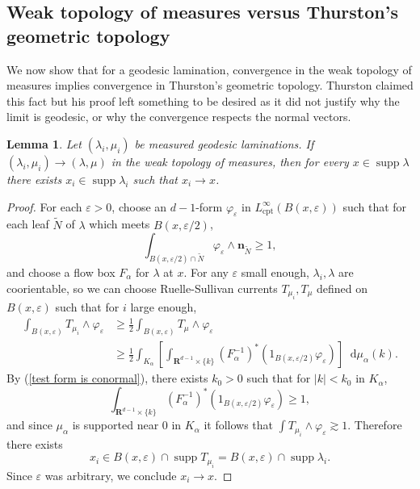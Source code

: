 \documentclass[reqno,11pt]{amsart}
\newcommand{\RR}{\mathbf{R}}
\newcommand*\dif{\mathop{}\!\mathrm{d}}
\DeclareMathOperator{\supp}{supp}
\newcommand{\normal}{\mathbf n}
\newcommand{\cpt}{\mathrm{cpt}}
\newtheorem{lemma}[theorem]{Lemma}
\theoremstyle{definition}
\numberwithin{equation}{section}
\begin{document}
\subsection{Weak topology of measures versus Thurston's geometric topology}
We now show that for a geodesic lamination, convergence in the weak topology of measures implies convergence in Thurston's geometric topology.
Thurston claimed this fact \cite[Proposition 8.10.3]{thurston1979geometry} but his proof left something to be desired as it did not justify why the limit is geodesic, or why the convergence respects the normal vectors.

\begin{lemma}
Let $(\lambda_i, \mu_i)$ be measured geodesic laminations.
If $(\lambda_i, \mu_i) \to (\lambda, \mu)$ in the weak topology of measures, then for every $x \in \supp \lambda$ there exists $x_i \in \supp \lambda_i$ such that $x_i \to x$.
\end{lemma}
\begin{proof}
For each $\varepsilon > 0$, choose an $d-1$-form $\varphi_\varepsilon$ in $L^\infty_\cpt(B(x, \varepsilon))$ such that for each leaf $\tilde N$ of $\lambda$ which meets $B(x, \varepsilon/2)$,
\begin{equation}\label{test form is conormal}
\int_{B(x, \varepsilon/2) \cap \tilde N} \varphi_\varepsilon \wedge \normal_{\tilde N} \geq 1,
\end{equation}
and choose a flow box $F_\alpha$ for $\lambda$ at $x$.
For any $\varepsilon$ small enough, $\lambda_i, \lambda$ are coorientable, so we can choose Ruelle-Sullivan currents $T_{\mu_i}, T_\mu$ defined on $B(x, \varepsilon)$ such that for $i$ large enough,
\begin{align*}
\int_{B(x, \varepsilon)} T_{\mu_i} \wedge \varphi_\varepsilon
&\geq \frac{1}{2} \int_{B(x, \varepsilon)} T_\mu \wedge \varphi_\varepsilon\\
&\geq \frac{1}{2} \int_{K_\alpha} \left[\int_{\RR^{d - 1} \times \{k\}} (F_\alpha^{-1})^* (1_{B(x, \varepsilon/2)} \varphi_\varepsilon)\right] \dif \mu_\alpha(k).
\end{align*}
By (\ref{test form is conormal}), there exists $k_0 > 0$ such that for $|k| < k_0$ in $K_\alpha$,
$$\int_{\RR^{d - 1} \times \{k\}} (F_\alpha^{-1})^* (1_{B(x, \varepsilon/2)} \varphi_\varepsilon) \geq 1,$$
and since $\mu_\alpha$ is supported near $0$ in $K_\alpha$ it follows that $\int T_{\mu_i} \wedge \varphi_\varepsilon \gtrsim 1$.
Therefore there exists
$$x_i \in B(x, \varepsilon) \cap \supp T_{\mu_i} = B(x, \varepsilon) \cap \supp \lambda_i.$$
Since $\varepsilon$ was arbitrary, we conclude $x_i \to x$.
\end{proof}
\end{document}

